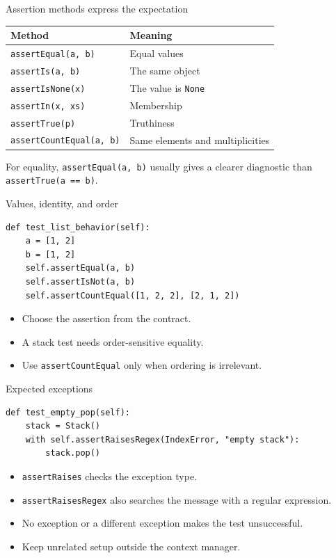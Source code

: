 \documentclass[aspectratio=169,11pt]{beamer}
\newcommand{\code}[1]{\texttt{#1}}
\begin{document}
\begin{frame}[fragile]{Assertion methods express the expectation}
\renewcommand{\arraystretch}{1.4}
\begin{tabular}{ll}
\toprule
Method & Meaning \\
\midrule
\code{assertEqual(a, b)} & Equal values \\
\code{assertIs(a, b)} & The same object \\
\code{assertIsNone(x)} & The value is \code{None} \\
\code{assertIn(x, xs)} & Membership \\
\code{assertTrue(p)} & Truthiness \\
\code{assertCountEqual(a, b)} & Same elements and multiplicities \\
\bottomrule
\end{tabular}
\medskip

For equality, \code{assertEqual(a, b)} usually gives a clearer diagnostic
than \code{assertTrue(a == b)}.
\end{frame}

\begin{frame}[fragile]{Values, identity, and order}
\begin{lstlisting}
def test_list_behavior(self):
    a = [1, 2]
    b = [1, 2]
    self.assertEqual(a, b)
    self.assertIsNot(a, b)
    self.assertCountEqual([1, 2, 2], [2, 1, 2])
\end{lstlisting}
\begin{itemize}
\item Choose the assertion from the contract.
\item A stack test needs order-sensitive equality.
\item Use \code{assertCountEqual} only when ordering is irrelevant.
\end{itemize}
\end{frame}

\begin{frame}[fragile]{Expected exceptions}
\begin{lstlisting}
def test_empty_pop(self):
    stack = Stack()
    with self.assertRaisesRegex(IndexError, "empty stack"):
        stack.pop()
\end{lstlisting}
\begin{itemize}
\item \code{assertRaises} checks the exception type.
\item \code{assertRaisesRegex} also searches the message with a regular expression.
\item No exception or a different exception makes the test unsuccessful.
\item Keep unrelated setup outside the context manager.
\end{itemize}
\end{frame}
\end{document}
